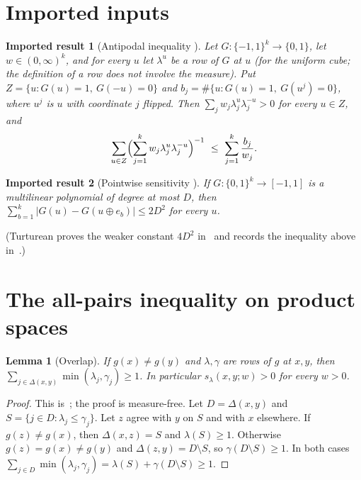 \documentclass[11pt]{article}
\numberwithin{equation}{section}
\newtheorem{lemma}[theorem]{Lemma}
\newtheorem*{imported}{Imported result}
\theoremstyle{definition}
\theoremstyle{remark}
\newcommand{\1}{\mathbf 1}
\begin{document}
\section{Imported inputs}

\begin{imported}[Antipodal inequality {\cite[Theorem~4.3]{Tur26}}]
Let $G:\{-1,1\}^k\to\{0,1\}$, let $w\in(0,\infty)^k$, and for every $u$ let $\lambda^u$ be a row of $G$ at $u$ (for the uniform cube; the definition of a row does not involve the measure). Put $Z=\{u:G(u)=1,\ G(-u)=0\}$ and $b_j=\#\{u:G(u)=1,\ G(u^j)=0\}$, where $u^j$ is $u$ with coordinate $j$ flipped. Then $\sum_jw_j\lambda^u_j\lambda^{-u}_j>0$ for every $u\in Z$, and
\[
\sum_{u\in Z}\Bigl(\sum_{j=1}^kw_j\lambda^u_j\lambda^{-u}_j\Bigr)^{-1}\ \le\ \sum_{j=1}^k\frac{b_j}{w_j}.
\]
\end{imported}

\begin{imported}[Pointwise sensitivity {\cite[Theorem~3.3]{FHKL16}}]
If $G:\{0,1\}^k\to[-1,1]$ is a multilinear polynomial of degree at most $D$, then $\sum_{b=1}^k|G(u)-G(u\oplus e_b)|\le 2D^2$ for every $u$.
\end{imported}
(Turturean proves the weaker constant $4D^2$ in~\cite[Lemma~6.3]{Tur26} and records the inequality above in~\cite[Remark~6.9]{Tur26}.)

\section{The all-pairs inequality on product spaces}

\begin{lemma}[Overlap]\label{lem:overlap}
If $g(x)\ne g(y)$ and $\lambda,\gamma$ are rows of $g$ at $x,y$, then $\sum_{j\in\Delta(x,y)}\min(\lambda_j,\gamma_j)\ge1$. In particular $s_\lambda(x,y;w)>0$ for every $w>0$.
\end{lemma}
\begin{proof}
This is~\cite[Lemma~4.1]{Tur26}; the proof is measure-free. Let $D=\Delta(x,y)$ and $S=\{j\in D:\lambda_j\le\gamma_j\}$. Let $z$ agree with $y$ on $S$ and with $x$ elsewhere. If $g(z)\ne g(x)$, then $\Delta(x,z)=S$ and $\lambda(S)\ge1$. Otherwise $g(z)=g(x)\ne g(y)$ and $\Delta(z,y)=D\setminus S$, so $\gamma(D\setminus S)\ge1$. In both cases $\sum_{j\in D}\min(\lambda_j,\gamma_j)=\lambda(S)+\gamma(D\setminus S)\ge1$.
\end{proof}
\end{document}
